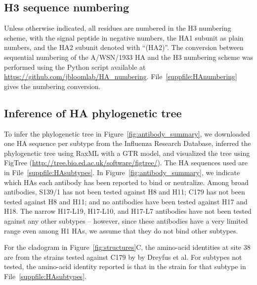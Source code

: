 \documentclass[11pt]{article}
\begin{document}
\subsection*{H3 sequence numbering}
Unless otherwise indicated, all residues are numbered in the H3 numbering scheme, with the signal peptide in negative numbers, the HA1 subunit as plain numbers, and the HA2 subunit denoted with ``(HA2)''. 
The conversion between sequential numbering of the A/WSN/1933 HA and the H3 numbering scheme was performed using the Python script available at \url{https://github.com/jbloomlab/HA_numbering}.
File~\ref{suppfile:HAnumbering} gives the numbering conversion.  

\subsection*{Inference of HA phylogenetic tree}
To infer the phylogenetic tree in Figure~\ref{fig:antibody_summary}, we downloaded one HA sequence per subtype from the Influenza Research Database\cite{zhang2017influenza}, inferred the phylogenetic tree using RaxML\cite{stamatakis2014raxml} with a GTR model, and visualized the tree using FigTree (\url{http://tree.bio.ed.ac.uk/software/figtree/}). 
The HA sequences used are in File~\ref{suppfile:HAsubtypes}. 
In Figure~\ref{fig:antibody_summary}, we indicate which HAs each antibody has been reported to bind or neutralize\cite{yoshida2009cross, lee2012heterosubtypic, okuno1993common, dreyfus2013structure, corti2011neutralizing}. 
Among broad antibodies, S139/1 has not been tested against H8 and H11; C179 has not been tested against H8 and H11; and no antibodies have been tested against H17 and H18.
The narrow H17-L19, H17-L10, and H17-L7 antibodies have not been tested against any other subtypes -- however, since these antibodies have a very limited range even among H1 HAs\cite{caton1982antigenic}, we assume that they do not bind other subtypes.

For the cladogram in Figure~\ref{fig:structures}C, the amino-acid identities at site 38 are from the strains tested against C179 by by Dreyfus et al\cite{dreyfus2013structure}. 
For subtypes not tested, the amino-acid identity reported is that in the strain for that subtype in File~\ref{suppfile:HAsubtypes}.
\end{document}
